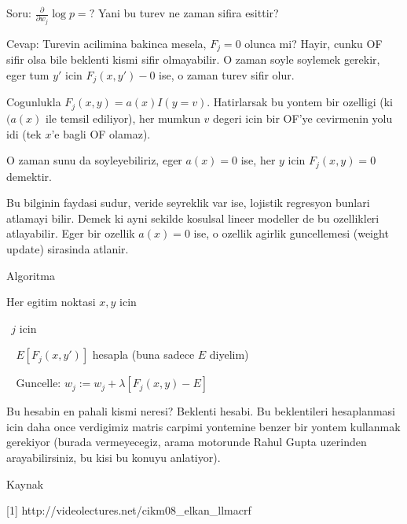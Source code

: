 \documentclass[12pt,fleqn]{article}\usepackage{../common}
\begin{document}
Soru: $\frac{\partial}{\partial w_j} \log p = ?$ Yani bu turev ne zaman sifira esittir? 

Cevap: Turevin acilimina bakinca mesela, $F_j=0$ olunca mi? Hayir, cunku OF
sifir olsa bile beklenti kismi sifir olmayabilir. O zaman soyle soylemek
gerekir, eger tum $y'$ icin $F_j(x,y') - 0$ ise, o zaman turev sifir olur. 

Cogunlukla $F_j(x,y) = a(x)I(y=v)$. Hatirlarsak bu yontem bir ozelligi (ki
$(a(x)$ ile temsil ediliyor), her mumkun $v$ degeri icin bir OF'ye
cevirmenin yolu idi (tek $x$'e bagli OF olamaz).

O zaman sunu da soyleyebiliriz, eger $a(x) = 0$ ise, her $y$ icin $F_j(x,y)
= 0$ 
demektir. 

Bu bilginin faydasi sudur, veride seyreklik var ise, lojistik regresyon
bunlari atlamayi bilir. Demek ki ayni sekilde kosulsal lineer modeller de
bu ozellikleri atlayabilir. Eger bir ozellik $a(x)=0$ ise, o ozellik
agirlik guncellemesi (weight update) sirasinda atlanir. 

Algoritma

Her egitim noktasi $x,y$ icin

$ \ \ $$j$ icin
    
$ \ \ \ \ $$E[F_j(x,y')]$ hesapla (buna sadece $E$ diyelim)
       
$ \ \ \ \ $Guncelle: $w_j := w_j + \lambda[F_j(x,y) - E]$


Bu hesabin en pahali kismi neresi? Beklenti hesabi. Bu beklentileri
hesaplanmasi icin daha once verdigimiz matris carpimi yontemine benzer bir
yontem kullanmak gerekiyor (burada vermeyecegiz, arama motorunde Rahul
Gupta uzerinden arayabilirsiniz, bu kisi bu konuyu anlatiyor).

Kaynak

[1] http://videolectures.net/cikm08\_elkan\_llmacrf
\end{document}
